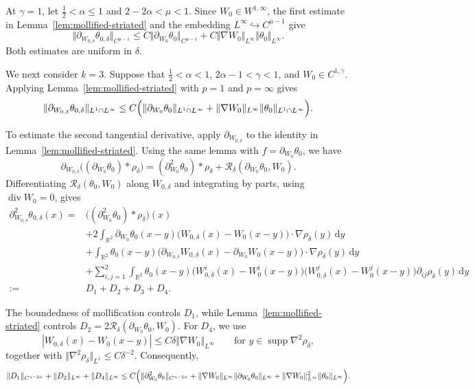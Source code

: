 \documentclass[reqno,11pt,a4paper]{amsart}
\newcommand{\dd}{\mathrm{d}}
\begin{document}
At $\gamma=1$, let $\frac12<\alpha\leq1$
and $2-2\alpha<\mu<1$.
Since $W_0\in W^{1,\infty}$,
the first estimate in Lemma~\ref{lem:mollified-striated}
and the embedding $L^\infty\hookrightarrow C^{\mu-1}$
give
\[
  \Vert \partial_{W_{0,\delta}}\theta_{0,\delta}
    \Vert _{C^{\mu-1}}
  \leq
  C\Vert \partial_{W_0}\theta_0\Vert _{C^{\mu-1}}
  +C\Vert \nabla W_0\Vert _{L^\infty}\Vert \theta_0\Vert _{L^\infty}.
\]
Both estimates are uniform in $\delta$.

We next consider $k=3$.
Suppose that $\frac12<\alpha<1$,
$2\alpha-1<\gamma<1$, and $W_0\in C^{1,\gamma}$.
Applying Lemma~\ref{lem:mollified-striated}
with $p=1$ and $p=\infty$ gives
\[
  \Vert \partial_{W_{0,\delta}}\theta_{0,\delta}
    \Vert _{L^1\cap L^\infty}
  \leq
  C\Bigl(
    \Vert \partial_{W_0}\theta_0\Vert _{L^1\cap L^\infty}
    +
    \Vert \nabla W_0\Vert _{L^\infty}
    \Vert \theta_0\Vert _{L^1\cap L^\infty}
  \Bigr).
\]

To estimate the second tangential derivative,
apply $\partial_{W_{0,\delta}}$ to the identity
in Lemma~\ref{lem:mollified-striated}.
Using the same lemma with $f=\partial_{W_0}\theta_0$,
we have
\[
  \partial_{W_{0,\delta}}
  \bigl((\partial_{W_0}\theta_0)*\rho_\delta\bigr)
  =
  (\partial_{W_0}^2\theta_0)*\rho_\delta
  +\mathcal R_\delta(\partial_{W_0}\theta_0,W_0).
\]
Differentiating $\mathcal R_\delta(\theta_0,W_0)$
along $W_{0,\delta}$ and integrating by parts,
using $\operatorname{div}W_0=0$, gives
\begin{align*}
  \partial_{W_{0,\delta}}^2\theta_{0,\delta}(x)
  ={}&
  \bigl((\partial_{W_0}^2\theta_0)*\rho_\delta\bigr)(x)
  \\
  &+
  2\int_{\mathbb R^2}
  \partial_{W_0}\theta_0(x-y)
  \bigl(W_{0,\delta}(x)-W_0(x-y)\bigr)
  \cdot\nabla\rho_\delta(y)\,\dd y
  \\
  &+
  \int_{\mathbb R^2}
  \theta_0(x-y)
  \bigl(
    \partial_{W_{0,\delta}}W_{0,\delta}(x)
    -\partial_{W_0}W_0(x-y)
  \bigr)
  \cdot\nabla\rho_\delta(y)\,\dd y
  \\
  &+
  \sum_{i,j=1}^2
  \int_{\mathbb R^2}
  \theta_0(x-y)
  \bigl(W_{0,\delta}^i(x)-W_0^i(x-y)\bigr)
  \bigl(W_{0,\delta}^j(x)-W_0^j(x-y)\bigr)
  \partial_{ij}\rho_\delta(y)\,\dd y
  \\
  :={}&D_1+D_2+D_3+D_4.
\end{align*}

The boundedness of mollification controls $D_1$,
while Lemma~\ref{lem:mollified-striated} controls
$D_2=2\mathcal R_\delta(\partial_{W_0}\theta_0,W_0)$.
For $D_4$, we use
\[
  |W_{0,\delta}(x)-W_0(x-y)|
  \leq C\delta\Vert \nabla W_0\Vert _{L^\infty}
  \qquad
  \text{for }y\in\operatorname{supp}\nabla^2\rho_\delta,
\]
together with
$\Vert \nabla^2\rho_\delta\Vert _{L^1}\leq C\delta^{-2}$.
Consequently,
\begin{align*}
  \Vert D_1\Vert _{C^{\gamma-2\alpha}}
  +\Vert D_2\Vert _{L^\infty}
  +\Vert D_4\Vert _{L^\infty}
  \leq
  C\Bigl(
    \Vert \partial_{W_0}^2\theta_0\Vert _{C^{\gamma-2\alpha}}
    +
    \Vert \nabla W_0\Vert _{L^\infty}
    \Vert \partial_{W_0}\theta_0\Vert _{L^\infty}
    +
    \Vert \nabla W_0\Vert _{L^\infty}^2
    \Vert \theta_0\Vert _{L^\infty}
  \Bigr).
\end{align*}
\end{document}
